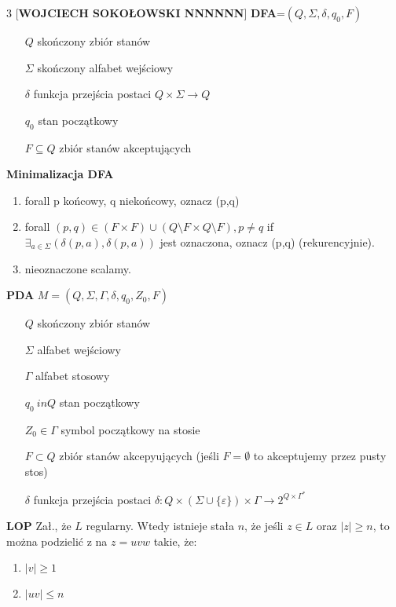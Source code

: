 
  \begin{multicols}{3}
    [\textbf{\Large WOJCIECH SOKOŁOWSKI NNNNNN}]
    \textbf{DFA}=$(Q,\Sigma , \delta , q_{0},F)$
    \begin{enumerate}
      \item [$Q$]skończony zbiór stanów
      \item [$\Sigma$]skończony alfabet wejściowy 
      \item [$\delta$]funkcja przejścia postaci   $Q\times\Sigma \rightarrow Q$
      \item [$q_{0}$]stan początkowy
      \item [$F \subseteq Q$]zbiór stanów akceptujących
    \end{enumerate}
    \textbf{Minimalizacja DFA}
    \begin{enumerate}
      \item forall p końcowy, q niekońcowy, oznacz (p,q)
      \item forall $(p,q) \in (F\times F) \cup (Q\setminus F \times Q\setminus F ), p \neq q $ if $\exists_{a \in \Sigma} (\delta (p,a), \delta (p,a))$ jest oznaczona, oznacz (p,q) (rekurencyjnie).
      \item nieoznaczone scalamy.
    \end{enumerate}
    \textbf{PDA} $M=(Q,\Sigma , \Gamma , \delta , q_{0} , Z_{0} , F)$
    \begin{enumerate}
      \item[$Q$] skończony zbiór stanów
      \item[$\Sigma$] alfabet wejściowy
      \item[$\Gamma$] alfabet stosowy
      \item[$q_{0} \ in Q$] stan początkowy
      \item[$Z_{0} \in \Gamma$] symbol początkowy na stosie
      \item[$F \subset Q$] zbiór stanów akcepyujących (jeśli $F=\emptyset$ to akceptujemy przez pusty stos)
      \item[$\delta $] funkcja przejścia postaci $\delta: Q \times (\Sigma \cup \lbrace \varepsilon \rbrace)\times \Gamma \rightarrow 2^{Q\times \Gamma ^{*}}$
    \end{enumerate}
    \textbf{LOP } Zał., że $L$ regularny. Wtedy istnieje stała $n$, że jeśli $z \in L$ oraz $|z| \geqslant n$, to można podzielić z na $z=uvw$ takie, że:
    \begin{enumerate}
      \item $|v| \geqslant 1$
      \item $|uv| \leqslant n$

\end{enumerate}
\end{multicols}
